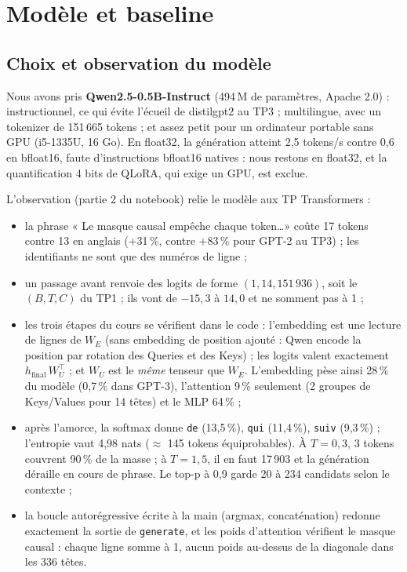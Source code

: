 \documentclass[10pt,a4paper]{article}
\newcommand{\code}[1]{\texttt{\small #1}}
\begin{document}
\section{Modèle et baseline}

\subsection{Choix et observation du modèle}

Nous avons pris \textbf{Qwen2.5-0.5B-Instruct} (494\,M de paramètres, Apache 2.0) : instructionnel,
ce qui évite l'écueil de distilgpt2 au TP3 ; multilingue, avec un tokenizer de 151\,665 tokens ; et
assez petit pour un ordinateur portable sans GPU (i5-1335U, 16 Go). En float32, la génération atteint
2,5 tokens/s contre 0,6 en bfloat16, faute d'instructions bfloat16 natives : nous restons en float32,
et la quantification 4 bits de QLoRA, qui exige un GPU, est exclue.

L'observation (partie 2 du notebook) relie le modèle aux TP Transformers :
\begin{itemize}
\item la phrase « Le masque causal empêche chaque token\dots » coûte 17 tokens contre 13 en anglais
  (+31\,\%, contre +83\,\% pour GPT-2 au TP3) ; les identifiants ne sont que des numéros de ligne ;
\item un passage avant renvoie des logits de forme $(1, 14, 151\,936)$, soit le $(B, T, C)$ du TP1 ;
  ils vont de $-15{,}3$ à $14{,}0$ et ne somment pas à 1 ;
\item les trois étapes du cours se vérifient dans le code : l'embedding est une lecture de lignes de
  $W_E$ (sans embedding de position ajouté : Qwen encode la position par rotation des Queries et des
  Keys) ; les logits valent exactement $h_\text{final}\,W_U^\top$ ; et $W_U$ est le \emph{même}
  tenseur que $W_E$. L'embedding pèse ainsi 28\,\% du modèle (0,7\,\% dans GPT-3), l'attention 9\,\%
  seulement (2 groupes de Keys/Values pour 14 têtes) et le MLP 64\,\% ;
\item après l'amorce, la softmax donne \code{\textvisiblespace de} (13,5\,\%), \code{\textvisiblespace qui} (11,4\,\%),
  \code{\textvisiblespace suiv} (9,3\,\%) ; l'entropie vaut 4,98 nats ($\approx$ 145 tokens équiprobables). À
  $T = 0{,}3$, 3 tokens couvrent 90\,\% de la masse ; à $T = 1{,}5$, il en faut 17\,903 et la génération
  déraille en cours de phrase. Le top-p à 0,9 garde 20 à 234 candidats selon le contexte ;
\item la boucle autorégressive écrite à la main (argmax, concaténation) redonne exactement la sortie
  de \code{generate}, et les poids d'attention vérifient le masque causal : chaque ligne somme à 1,
  aucun poids au-dessus de la diagonale dans les 336 têtes.
\end{itemize}
\end{document}
